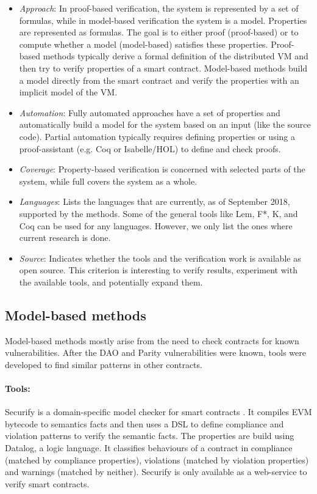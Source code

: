 \documentclass{llncs}
\begin{document}
\begin{itemize}
\item \emph{Approach}: In proof-based verification, the system is represented by a set of formulas, while in model-based verification the system is a model. Properties are represented as formulas. The goal is to either proof (proof-based) or to compute whether a model (model-based) satisfies these properties. Proof-based methods typically derive a formal definition of the distributed VM and then try to verify properties of a smart contract. Model-based methods build a model directly from the smart contract and verify the properties with an implicit model of the VM.
\item \emph{Automation}: Fully automated approaches have a set of properties and automatically build a model for the system based on an input (like the source code). Partial automation typically requires defining properties or using a proof-assistant (e.g. Coq or Isabelle/HOL) to define and check proofs.
\item \emph{Coverage}: Property-based verification is concerned with selected parts of the system, while full covers the system as a whole.
\item \emph{Languages}: Lists the languages that are currently, as of September 2018, supported by the methods. Some of the general tools like Lem, F*, K, and Coq can be used for any languages. However, we only list the ones where current research is done.
\item \emph{Source}: Indicates whether the tools and the verification work is available as open source. This criterion is interesting to verify results, experiment with the available tools, and potentially expand them.
\end{itemize}




\subsection{Model-based methods}
Model-based methods mostly arise from the need to check contracts for known vulnerabilities. After the DAO and Parity vulnerabilities were known, tools were developed to find similar patterns in other contracts.

\paragraph{Tools:}
Securify is a domain-specific model checker for smart contracts \cite{Tsankov2017}. It compiles EVM bytecode to semantics facts and then uses a DSL to define compliance and violation patterns to verify the semantic facts. The properties are build using Datalog, a logic language. It classifies behaviours of a contract in compliance (matched by compliance properties), violations (matched by violation properties) and warnings (matched by neither). Securify is only available as a web-service to verify smart contracts.
\end{document}
